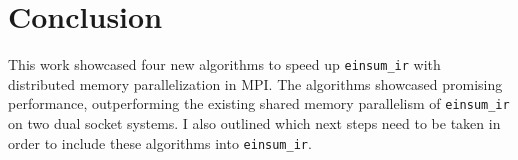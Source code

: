 \section{Conclusion}

This work showcased four new algorithms to speed up \texttt{einsum\_ir} with distributed memory parallelization in MPI.
The algorithms showcased promising performance, outperforming the existing shared memory parallelism of \texttt{einsum\_ir} on two dual socket systems.
I also outlined which next steps need to be taken in order to include these algorithms into \texttt{einsum\_ir}.